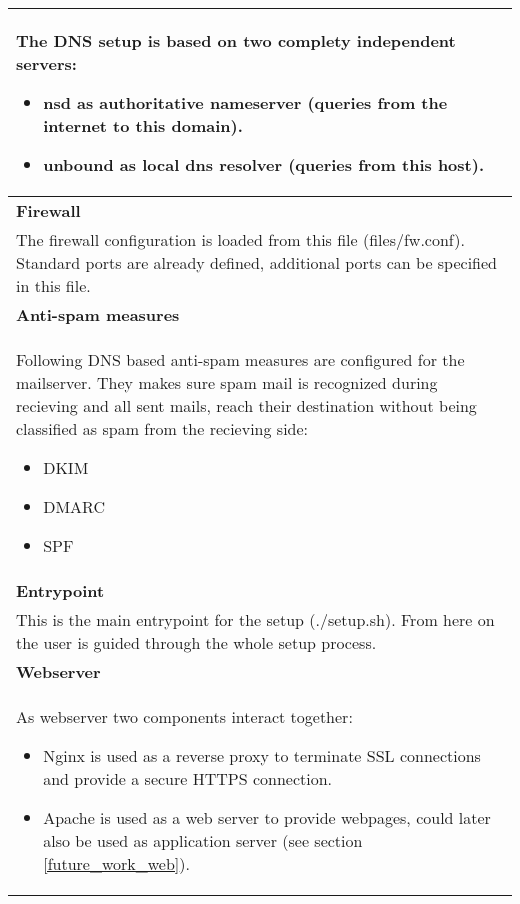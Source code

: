 \begin{table}[H]
\begin{minipage}{.5\textwidth}
\begin{tabularx}{\textwidth}{|X|}
        \hline
        The DNS setup is based on two complety independent servers:
        \begin{itemize}
            \item{} \gls{nsd} as authoritative nameserver (queries from the internet to this domain).
            \item{} \gls{unbound} as local dns resolver (queries from this host).
        \end{itemize}
        \\
        \hline
        \cellcolor{YellowGreen} \textbf{Firewall} \\
        \hline
        The firewall configuration is loaded from this file (files/fw.conf). Standard ports are already defined, additional ports can be specified in this file. \\
        \hline
        \cellcolor{SkyBlue} \textbf{Anti-spam measures} \\
        \hline
        Following \gls{DNS} based anti-spam measures are configured for the mailserver. They makes sure spam mail is recognized during recieving and all sent mails, reach their destination without being classified as spam from the recieving side:
        \begin{itemize}
            \item{} \gls{DKIM}
            \item{} \gls{DMARC}
            \item{} \gls{SPF}
        \end{itemize} \\
        \hline
        \cellcolor{Rhodamine} \textbf{Entrypoint} \\
        \hline
        This is the main entrypoint for the setup (./setup.sh). From here on the user is guided through the whole setup process. \\
        \hline
        \cellcolor{Goldenrod} \textbf{Webserver} \\
        \hline
        As webserver two components interact together:
        \begin{itemize}
            \item{} \gls{Nginx} is used as a reverse proxy to terminate SSL connections and provide a secure HTTPS connection.
            \item{} \gls{Apache} is used as a web server to provide webpages, could later also be used as application server (see section \ref{future_work_web}).
        \end{itemize} \\
        \hline
    \end{tabularx}
\end{minipage}
\end{table}
